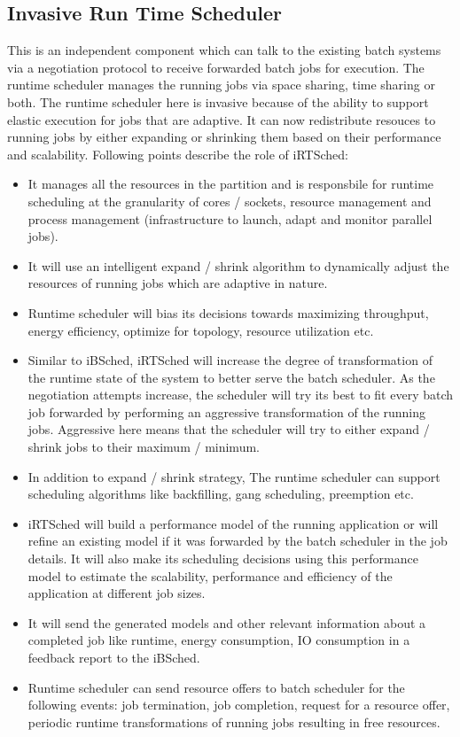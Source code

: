 \subsection{Invasive Run Time Scheduler}
This is an independent component which can talk to the existing batch systems via a negotiation protocol to receive forwarded batch jobs for execution. The runtime scheduler manages the running jobs via space sharing, time sharing or both. The runtime scheduler here is invasive because of the ability to support elastic execution for jobs that are adaptive. It can now redistribute resouces to running jobs by either expanding or shrinking them based on their performance and scalability. Following points describe the role of iRTSched:
\begin{itemize}
\item It manages all the resources in the partition and is responsbile for runtime scheduling at the granularity of cores / sockets, resource management and process management (infrastructure to launch, adapt and monitor parallel jobs).
\item It will use an intelligent expand / shrink algorithm to dynamically adjust the resources of running jobs which are adaptive in nature. 
\item Runtime scheduler will bias its decisions towards maximizing throughput, energy efficiency, optimize for topology, resource utilization etc.
\item Similar to iBSched, iRTSched will increase the degree of transformation of the runtime state of the system to better serve the batch scheduler. As the negotiation attempts increase, the scheduler will try its best to fit every batch job forwarded by performing an aggressive transformation of the running jobs. Aggressive here means that the scheduler will try to either expand / shrink jobs to their maximum / minimum.
\item In addition to expand / shrink strategy, The runtime scheduler can support scheduling algorithms like backfilling, gang scheduling, preemption etc.
\item iRTSched will build a performance model of the running application or will refine an existing model if it was forwarded by the batch scheduler in the job details. It will also make its scheduling decisions using this performance model to estimate the scalability, performance and efficiency of the application at different job sizes.
\item It will send the generated models and other relevant information about a completed job like runtime, energy consumption, IO consumption in a feedback report to the iBSched.
\item Runtime scheduler can send resource offers to batch scheduler for the following events: job termination, job completion, request for a resource offer, periodic runtime transformations of running jobs resulting in free resources.
\end{itemize}
